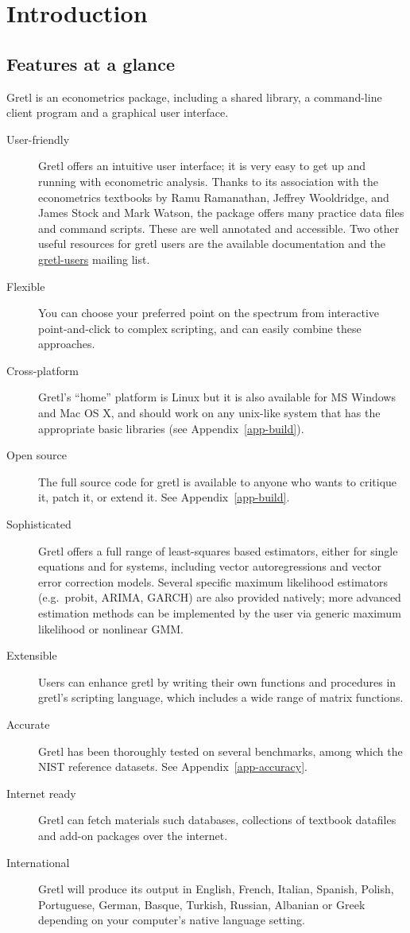 \chapter{Introduction}
\label{chap:introduction}


\section{Features at a glance}
\label{features}

Gretl is an econometrics package, including a shared library, a
command-line client program and a graphical user interface.
    
\begin{description}
\item[User-friendly] Gretl offers an intuitive user interface;
  it is very easy to get up and running with econometric analysis.
  Thanks to its association with the econometrics textbooks by Ramu
  Ramanathan, Jeffrey Wooldridge, and James Stock and Mark Watson, the
  package offers many practice data files and command scripts.  These
  are well annotated and accessible. Two other useful resources for gretl
  users are the available documentation and the
  \href{http://gretl.sourceforge.net/lists.html}{gretl-users} mailing
  list.
\item[Flexible] You can choose your preferred point on the spectrum
  from interactive point-and-click to complex scripting, and can easily
  combine these approaches.
\item[Cross-platform] Gretl's ``home'' platform is Linux but it
  is also available for MS Windows and Mac OS X, and should work on
  any unix-like system that has the appropriate basic libraries (see
  Appendix~\ref{app-build}).
\item[Open source] The full source code for gretl is available
  to anyone who wants to critique it, patch it, or extend it.
  See Appendix~\ref{app-build}.
\item[Sophisticated] Gretl offers a full range of least-squares
  based estimators, either for single equations and for systems,
  including vector autoregressions and vector error correction models.
  Several specific maximum likelihood estimators (e.g.\ probit, ARIMA,
  GARCH) are also provided natively; more advanced estimation methods
  can be implemented by the user via generic maximum likelihood or
  nonlinear GMM.
\item[Extensible] Users can enhance gretl by writing their own
  functions and procedures in gretl's scripting language, which
  includes a wide range of matrix functions.
\item[Accurate] Gretl has been thoroughly tested on several
  benchmarks, among which the NIST reference datasets. See
  Appendix~\ref{app-accuracy}.
\item[Internet ready] Gretl can fetch materials such databases,
  collections of textbook datafiles and add-on packages over the
  internet.
\item[International] Gretl will produce its output in English,
  French, Italian, Spanish, Polish, Portuguese, German, Basque,
  Turkish, Russian, Albanian or Greek depending on your computer's
  native language setting.
\end{description}


